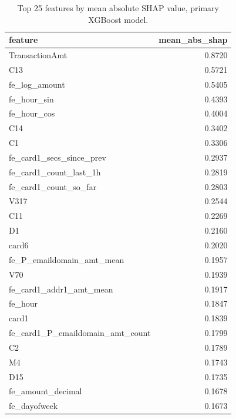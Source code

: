 \begin{table}
\caption{Top 25 features by mean absolute SHAP value, primary XGBoost model.}
\label{tab:table12_shap_top_features}
\begin{tabular}{lr}
\toprule
feature & mean\_abs\_shap \\
\midrule
TransactionAmt & 0.8720 \\
C13 & 0.5721 \\
fe\_log\_amount & 0.5405 \\
fe\_hour\_sin & 0.4393 \\
fe\_hour\_cos & 0.4004 \\
C14 & 0.3402 \\
C1 & 0.3306 \\
fe\_card1\_secs\_since\_prev & 0.2937 \\
fe\_card1\_count\_last\_1h & 0.2819 \\
fe\_card1\_count\_so\_far & 0.2803 \\
V317 & 0.2544 \\
C11 & 0.2269 \\
D1 & 0.2160 \\
card6 & 0.2020 \\
fe\_P\_emaildomain\_amt\_mean & 0.1957 \\
V70 & 0.1939 \\
fe\_card1\_addr1\_amt\_mean & 0.1917 \\
fe\_hour & 0.1847 \\
card1 & 0.1839 \\
fe\_card1\_P\_emaildomain\_amt\_count & 0.1799 \\
C2 & 0.1789 \\
M4 & 0.1743 \\
D15 & 0.1735 \\
fe\_amount\_decimal & 0.1678 \\
fe\_dayofweek & 0.1673 \\
\bottomrule
\end{tabular}
\end{table}
